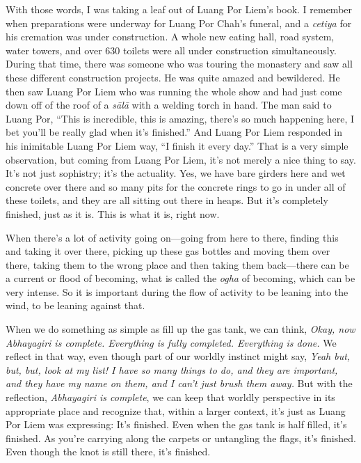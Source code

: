 With those words, I was taking a leaf out of Luang Por Liem's book. I 
remember when preparations were underway for Luang Por Chah's funeral, 
and a \emph{cetiya} for his cremation was under construction. A whole 
new eating hall, road system, water towers, and over 630 toilets were 
all under construction simultaneously. During that time, there was 
someone who was touring the monastery and saw all these different 
construction projects. He was quite amazed and bewildered. He then saw 
Luang Por Liem who was running the whole show and had just come down 
off of the roof of a \emph{sālā} with a welding torch in hand. The 
man said to Luang Por, ``This is incredible, this is amazing, there's 
so much happening here, I bet you'll be really glad when it's 
finished.'' And Luang Por Liem responded in his inimitable Luang Por 
Liem way, ``I finish it every day.'' That is a very simple observation, 
but coming from Luang Por Liem, it's not merely a nice thing to say. 
It's not just sophistry; it's the actuality. Yes, we have bare girders 
here and wet concrete over there and so many pits for the concrete 
rings to go in under all of these toilets, and they are all sitting out 
there in heaps. But it's completely finished, just as it is. This is 
what it is, right now.

When there's a lot of activity going on---going from here to there, 
finding this and taking it over there, picking up these gas bottles and 
moving them over there, taking them to the wrong place and then taking 
them back---there can be a current or flood of becoming, what is called 
the \emph{ogha} of becoming, which can be very intense. So it is 
important during the flow of activity to be leaning into the wind, to 
be leaning against that.

When we do something as simple as fill up the gas tank, we can think, 
\emph{Okay, now Abhayagiri is complete. Everything is fully completed. 
Everything is done.} We reflect in that way, even though part of our 
worldly instinct might say, \emph{Yeah but, but, but, look at my list! 
I have so many things to do, and they are important, and they have my 
name on them, and I can't just brush them away.} But with the 
reflection, \emph{Abhayagiri is complete}, we can keep that worldly 
perspective in its appropriate place and recognize that, within a 
larger context, it's just as Luang Por Liem was expressing: It's 
finished. Even when the gas tank is half filled, it's finished. As 
you're carrying along the carpets or untangling the flags, it's 
finished. Even though the knot is still there, it's finished.

